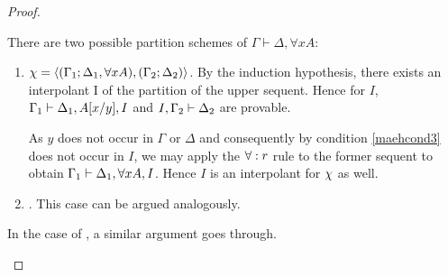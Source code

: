 \begin{proof}
\begin{description}
\begin{itemize}
					There are two possible partition schemes of $\Gamma\vdash \Delta, \forall x A $:
					\begin{enumerate}
						\item $\chi =  \langle (\Gamma_1; \Delta_1, \forall x A), (\Gamma_2; \Delta_2)\rangle $.
							By the induction hypothesis, there exists an interpolant I of the partition 
							 of the upper sequent.
							Hence for $I$, 
							$\Gamma_1 \vdash \Delta_1, A[x/y], I$ and
							$I, \Gamma_2 \vdash \Delta_2$ are provable.

						As $y$ does not occur in $\Gamma$ or $\Delta$ and consequently by condition \ref{maehcond3} does not occur in $I$, we may apply the $\operatorname{\forall}:r$ rule to the former sequent to obtain $\Gamma_1 \vdash \Delta_1, \forall x A, I$.
							Hence $I$ is an interpolant for $\chi$ as well.

						\item {}.
							This case can be argued analogously.
					\end{enumerate}

					In the case of , a similar argument goes through.
					\qedhere
			\end{itemize}
			\begin{comment} %
			\item[\normalfont Equality rules.]
				Suppose the property holds for $n$ rule applications and the $(n+1)$th rule is an equality rule.

				\begin{itemize}
					\item The last rule application is an instance of $\lkrule{=}{r_1}$. Then it is of the form:
						\begin{prooftree}
							\Axiomm{\Gamma\fCenter \Delta, A\subst{T/t} }
							\Axiomm{\Sigma \fCenter \Pi, s=t}
							\RightLabelm{\lkrule{=}{r_1}}
							\BinaryInfm{\Gamma, \Sigma\fCenter \Delta, \Pi, A\subst{T/s}  }
						\end{prooftree}

						There are two possible partition schemes of $\Gamma, \Sigma \vdash \Delta, \Pi A\subst{T/s} $:
						\begin{enumerate}
							\item $\partisym = \parti{\Gamma_1, \Sigma_1}{\Delta_1, \Pi_1, A\subst{T/s}}{\Gamma_2, \Sigma_2}{\Delta_2, \Pi_2}$.  


\end{comment}
\end{description}
\end{proof}
